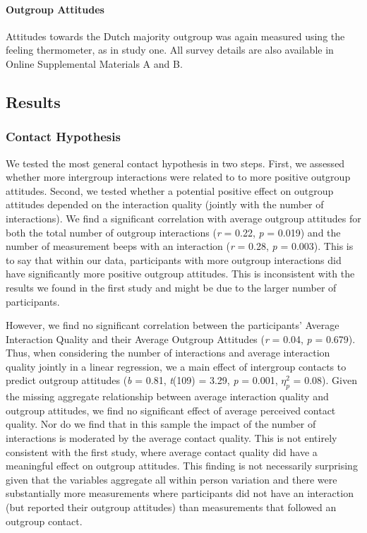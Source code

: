 \paragraph{Outgroup Attitudes}

Attitudes towards the Dutch majority outgroup was again measured using
the feeling thermometer, as in study one. All survey details are also
available in Online Supplemental Materials A and B.




\subsection{Results}

\subsubsection{Contact Hypothesis}

We tested the most general contact hypothesis in two steps. First, we
assessed whether more intergroup interactions were related to to more
positive outgroup attitudes. Second, we tested whether a potential
positive effect on outgroup attitudes depended on the interaction
quality (jointly with the number of interactions). We find a significant
correlation with average outgroup attitudes for both the total number of
outgroup interactions (\textit{r} = 0.22, \textit{p} = 0.019) and the
number of measurement beeps with an interaction (\textit{r} = 0.28,
\textit{p} = 0.003). This is to say that within our data, participants
with more outgroup interactions did have significantly more positive
outgroup attitudes. This is inconsistent with the results we found in
the first study and might be due to the larger number of participants.

However, we find no significant correlation between the participants'
Average Interaction Quality and their Average Outgroup Attitudes
(\textit{r} = 0.04, \textit{p} = 0.679). Thus, when considering the
number of interactions and average interaction quality jointly in a
linear regression, we a main effect of intergroup contacts to predict
outgroup attitudes (\textit{b} = 0.81, \textit{t}(109) = 3.29,
\textit{p} = 0.001, \(\eta_p^2\) = 0.08). Given the missing aggregate
relationship between average interaction quality and outgroup attitudes,
we find no significant effect of average perceived contact quality. Nor
do we find that in this sample the impact of the number of interactions
is moderated by the average contact quality. This is not entirely
consistent with the first study, where average contact quality did have
a meaningful effect on outgroup attitudes. This finding is not
necessarily surprising given that the variables aggregate all within
person variation and there were substantially more measurements where
participants did not have an interaction (but reported their outgroup
attitudes) than measurements that followed an outgroup contact.

